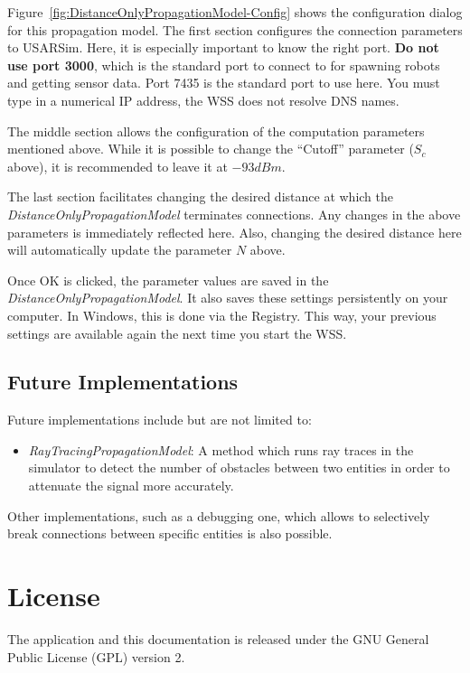 \documentclass[11pt,a4paper]{article}
\begin{document}
Figure~\ref{fig:DistanceOnlyPropagationModel-Config} shows the configuration dialog for this propagation model. The first section configures the connection parameters to USARSim. Here, it is especially important to know the right port. \textbf{Do not use port 3000}, which is the standard port to connect to for spawning robots and getting sensor data. Port 7435 is the standard port to use here. You must type in a numerical IP address, the WSS does not resolve DNS names.

The middle section allows the configuration of the computation parameters mentioned above. While it is possible to change the ``Cutoff'' parameter ($S_c$ above), it is recommended to leave it at $-93dBm$.

The last section facilitates changing the desired distance at which the \emph{DistanceOnlyPropagationModel} terminates connections. Any changes in the above parameters is immediately reflected here. Also, changing the desired distance here will automatically update the parameter $N$ above.

Once OK is clicked, the parameter values are saved in the \emph{DistanceOnlyPropagationModel}. It also saves these settings persistently on your computer. In Windows, this is done via the Registry. This way, your previous settings are available again the next time you start the WSS.

\subsection{Future Implementations}

Future implementations include but are not limited to:
\begin{itemize}
	\item \emph{RayTracingPropagationModel}: A method which runs ray traces in the simulator to detect the number of obstacles between two entities in order to attenuate the signal more accurately.
\end{itemize}

Other implementations, such as a debugging one, which allows to selectively break connections between specific entities is also possible.

\section{License}

The application and this documentation is released under the GNU General Public License (GPL) version 2.
\end{document}
